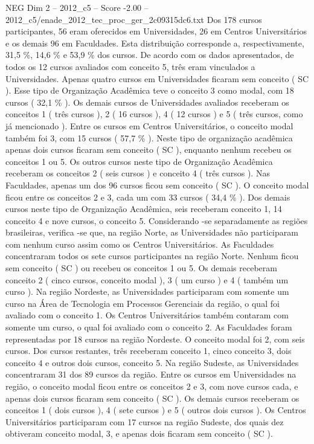 \begin{textsample}{NEG Dim 2 – 2012\_c5 – Score -2.00 – 2012\_c5/enade\_2012\_tec\_proc\_ger\_2c09315dc6.txt}
Dos 178 cursos participantes, 56 eram oferecidos em Universidades, 26 em Centros Universitários e os demais 96 em Faculdades.
Esta distribuição corresponde a, respectivamente, 31,5 \%, 14,6 \% e 53,9 \% dos cursos.
De acordo com os dados apresentados, de todos os 12 cursos avaliados com conceito 5, três eram vinculados a Universidades.
Apenas quatro cursos em Universidades ficaram sem conceito ( SC ).
Esse tipo de Organização Acadêmica teve o conceito 3 como modal, com 18 cursos ( 32,1 \% ).
Os demais cursos de Universidades avaliados receberam os conceitos 1 ( três cursos ), 2 ( 16 cursos ), 4 ( 12 cursos ) e 5 ( três cursos, como já mencionado ).
Entre os cursos em Centros Universitários, o conceito modal também foi 3, com 15 cursos ( 57,7 \% ).
Neste tipo de organização acadêmica apenas dois cursos ficaram sem conceito ( SC ), enquanto nenhum recebeu os conceitos 1 ou 5.
Os outros cursos neste tipo de Organização Acadêmica receberam os conceitos 2 ( seis cursos ) e conceito 4 ( três cursos ).
Nas Faculdades, apenas um dos 96 cursos ficou sem conceito ( SC ).
O conceito modal ficou entre os conceitos 2 e 3, cada um com 33 cursos ( 34,4 \% ).
Dos demais cursos neste tipo de Organização Acadêmica, seis receberam conceito 1, 14 conceito 4 e nove cursos, o conceito 5.
Considerando -se separadamente as regiões brasileiras, verifica -se que, na região Norte, as Universidades não participaram com nenhum curso assim como os Centros Universitários.
As Faculdades concentraram todos os sete cursos participantes na região Norte.
Nenhum ficou sem conceito ( SC ) ou recebeu os conceitos 1 ou 5.
Os demais receberam conceito 2 ( cinco cursos, conceito modal ), 3 ( um curso ) e 4 ( também um curso ).
Na região Nordeste, as Universidades participaram com somente um curso na Área de Tecnologia em Processos Gerenciais da região, o qual foi avaliado com o conceito 1.
Os Centros Universitários também contaram com somente um curso, o qual foi avaliado com o conceito 2.
As Faculdades foram representadas por 18 cursos na região Nordeste.
O conceito modal foi 2, com seis cursos.
Dos cursos restantes, três receberam conceito 1, cinco conceito 3, dois conceito 4 e outros dois cursos, conceito 5.
Na região Sudeste, as Universidades concentraram 31 dos 89 cursos da região.
Entre os cursos em Universidades na região, o conceito modal ficou entre os conceitos 2 e 3, com nove cursos cada, e apenas dois cursos ficaram sem conceito ( SC ).
Os demais cursos receberam os conceitos 1 ( dois cursos ), 4 ( sete cursos ) e 5 ( outros dois cursos ).
Os Centros Universitários participaram com 17 cursos na região Sudeste, dos quais dez obtiveram conceito modal, 3, e apenas dois ficaram sem conceito ( SC ).

\end{textsample}
